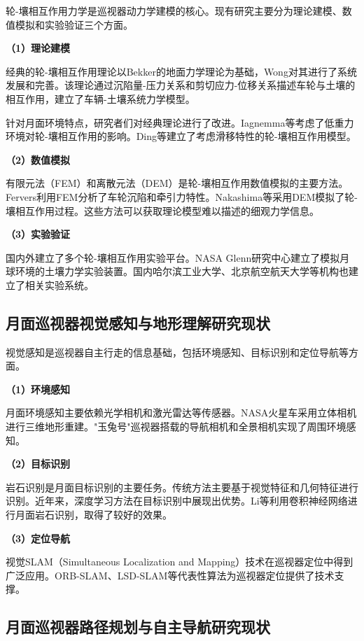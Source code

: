 轮-壤相互作用力学是巡视器动力学建模的核心。现有研究主要分为理论建模、数值模拟和实验验证三个方面。

\textbf{（1）理论建模}

经典的轮-壤相互作用理论以Bekker\cite{ref11}的地面力学理论为基础，Wong\cite{ref18}对其进行了系统发展和完善。该理论通过沉陷量-压力关系和剪切应力-位移关系描述车轮与土壤的相互作用，建立了车辆-土壤系统力学模型。

针对月面环境特点，研究者们对经典理论进行了改进。Iagnemma等\cite{ref19}考虑了低重力环境对轮-壤相互作用的影响。Ding等\cite{ref20}建立了考虑滑移特性的轮-壤相互作用模型。

\textbf{（2）数值模拟}

有限元法（FEM）和离散元法（DEM）是轮-壤相互作用数值模拟的主要方法。Fervers\cite{ref21}利用FEM分析了车轮沉陷和牵引力特性。Nakashima等\cite{ref22}采用DEM模拟了轮-壤相互作用过程。这些方法可以获取理论模型难以描述的细观力学信息。

\textbf{（3）实验验证}

国内外建立了多个轮-壤相互作用实验平台。NASA Glenn研究中心建立了模拟月球环境的土壤力学实验装置\cite{ref23}。国内哈尔滨工业大学、北京航空航天大学等机构也建立了相关实验系统\cite{ref24}。

\subsection{月面巡视器视觉感知与地形理解研究现状}
\label{subsec:visual_perception}

视觉感知是巡视器自主行走的信息基础，包括环境感知、目标识别和定位导航等方面。

\textbf{（1）环境感知}

月面环境感知主要依赖光学相机和激光雷达等传感器。NASA火星车采用立体相机进行三维地形重建\cite{ref25}。"玉兔号"巡视器搭载的导航相机和全景相机实现了周围环境感知\cite{ref26}。

\textbf{（2）目标识别}

岩石识别是月面目标识别的主要任务。传统方法主要基于视觉特征和几何特征进行识别\cite{ref27}。近年来，深度学习方法在目标识别中展现出优势。Li等\cite{ref28}利用卷积神经网络进行月面岩石识别，取得了较好的效果。

\textbf{（3）定位导航}

视觉SLAM（Simultaneous Localization and Mapping）技术在巡视器定位中得到广泛应用。ORB-SLAM\cite{ref29}、LSD-SLAM\cite{ref30}等代表性算法为巡视器定位提供了技术支撑。

\subsection{月面巡视器路径规划与自主导航研究现状}
\label{subsec:path_planning}

